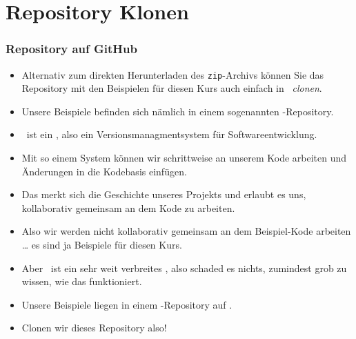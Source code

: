 \documentclass[aspectratio=169,mathserif,notheorems]{beamer}%
\begin{document}
\section{Repository Klonen}%
%
\begin{frame}[t]%
\frametitle{Repository auf GitHub}%
\begin{itemize}%
\item Alternativ zum direkten Herunterladen des \texttt{zip}-Archivs können Sie das Repository mit den Beispielen für diesen Kurs auch einfach in \pycharm\ \emph{clonen}.%
\item<2-> Unsere Beispiele befinden sich nämlich in einem sogenannten \git-Repository\cite{S2023LG,T2024BGAGVCPMATFTND}.%
\item<3-> \git\ ist ein \cite{S2023LG,T2024BGAGVCPMATFTND}, also ein Versionsmanagmentsystem für Softwareentwicklung.%
\item<4-> Mit so einem System können wir schrittweise an unserem Kode arbeiten und Änderungen in die Kodebasis einfügen.%
\item<5-> Das  merkt sich die Geschichte unseres Projekts und erlaubt es uns, kollaborativ gemeinsam an dem Kode zu arbeiten.%
\item<6-> Also wir werden nicht kollaborativ gemeinsam an dem Beispiel-Kode arbeiten {\dots} es sind ja Beispiele für diesen Kurs.%
\item<7-> Aber \git\ ist ein sehr weit verbreites , also schaded es nichts, zumindest grob zu wissen, wie das funktioniert.%
\item<8-> Unsere Beispiele liegen in einem \git-Repository auf \github\cite{PRGWSUdVLFTEKPKFBV2016TSRFTAOGAG,T2024BGAGVCPMATFTND}.%
\item<9-> Clonen wir dieses Repository also!%
\end{itemize}%
\end{frame}%
%
\end{document}
